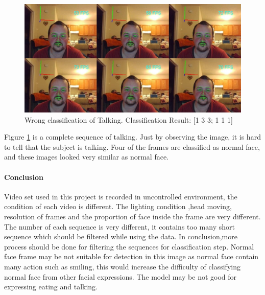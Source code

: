 \begin{figure}[ht]
\centering
\includegraphics[width = \textwidth]{imgs/Wrong_T00.jpg}
\caption{Wrong classification of Talking. Classification Result: [1 3 3; 1 1 1]}
\label{fig:EXPT}
\end{figure}
\newline
Figure \ref{fig:EXPT} is a complete sequence of talking. Just by observing the image, it is hard to tell that the subject is talking. Four of the frames are classified as normal face, and these images looked very similar as normal face.
\paragraph{Conclusion}
Video set used in this project is recorded in uncontrolled environment, the condition of each video is different. The lighting condition ,head moving, resolution of frames and the proportion of face inside the frame are very different. The number of each sequence is very different, it contains too many short sequence which should be filtered while using the data. In conclusion,more process should be done for filtering the sequences for classification step. Normal face frame may be not suitable for detection in this image as normal face contain many action such as smiling, this would increase the difficulty of classifying normal face from other facial expressions. The model may be not good for expressing eating and talking.